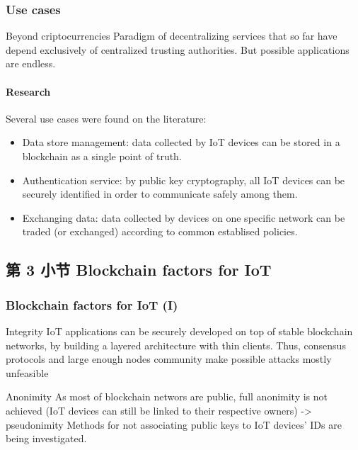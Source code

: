 \documentclass[
    aspectratio=169,                   %
]{beamer}
\begin{document}
    \begin{frame}
        \frametitle{Use cases}

        \begin{block}{Beyond criptocurrencies}
            Paradigm of decentralizing services that so far have depend exclusively of centralized trusting authorities. But possible applications are endless.
        \end{block}

        \paragraph{Research} Several use cases were found on the literature:

        \begin{itemize}
            \item \alert{Data store management}: data collected by IoT devices can be stored in a blockchain as a single point of truth.\cite{sia}
            \item \alert{Authentication service}: by public key cryptography, all IoT devices can be securely identified in order to communicate safely among them.\cite{Axon2015PrivacyawarenessIB}
            \item \alert{Exchanging data}: data collected by devices on one specific network can be traded (or exchanged) according to common establised policies.
        \end{itemize}

    \end{frame}

\subsection{第 3 小节 Blockchain factors for IoT}

    \begin{frame}
        \frametitle{Blockchain factors for IoT (I)}

        \begin{block}{Integrity}
            IoT applications can be securely developed on top of stable blockchain networks, by building a layered architecture with thin clients.\cite{Ali2016BlockstackDA} Thus, consensus protocols and large enough nodes community make possible attacks mostly unfeasible
        \end{block}
        \begin{block}{Anonimity}
            As most of blockchain networs are public, full anonimity is not achieved (IoT devices can still be linked to their respective owners) -> \alert{pseudonimity}
            Methods for not associating public keys to IoT devices' IDs are being investigated.\cite{Axon2015PrivacyawarenessIB}
        \end{block}

    \end{frame}
\end{document}
